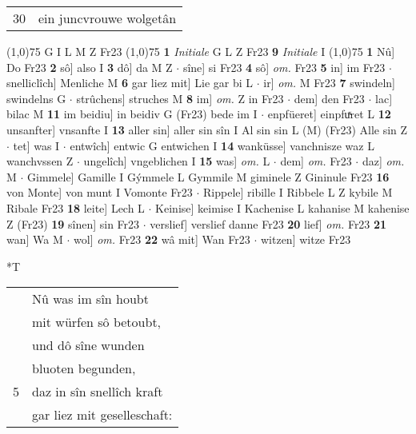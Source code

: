 \documentclass[8pt,a4paper,notitlepage]{article}
\begin{document}
\begin{table}[ht]
\begin{minipage}[t]{0.5\linewidth}
\begin{tabular}{rl}
30 & ein juncvrouwe wolgetân\\ 
\end{tabular}
\scriptsize
\line(1,0){75} \newline
G I L M Z Fr23 \newline
\line(1,0){75} \newline
\textbf{1} \textit{Initiale} G L Z Fr23  \textbf{9} \textit{Initiale} I  \newline
\line(1,0){75} \newline
\textbf{1} Nû] Do Fr23 \textbf{2} sô] also I \textbf{3} dô] da M Z  $\cdot$ sîne] si Fr23 \textbf{4} sô] \textit{om.} Fr23 \textbf{5} in] im Fr23  $\cdot$ snelliclîch] Menliche M \textbf{6} gar liez mit] Lie gar bi L  $\cdot$ ir] \textit{om.} M Fr23 \textbf{7} swindeln] swindelns G  $\cdot$ strûchens] struches M \textbf{8} im] \textit{om.} Z in Fr23  $\cdot$ dem] den Fr23  $\cdot$ lac] bilac M \textbf{11} im beidiu] in beidiv G (Fr23) bede im I  $\cdot$ enpfüeret] einpfuͯret L \textbf{12} unsanfter] vnsanfte I \textbf{13} aller sin] aller sin sîn I Al sin sin L (M) (Fr23) Alle sin Z  $\cdot$ tet] was I  $\cdot$ entwîch] entwic G entwichen I \textbf{14} wanküsse] vanchnisze waz L wanchvssen Z  $\cdot$ ungelîch] vngeblichen I \textbf{15} was] \textit{om.} L  $\cdot$ dem] \textit{om.} Fr23  $\cdot$ daz] \textit{om.} M  $\cdot$ Gimmele] Gamille I Gýmmele L Gymmile M giminele Z Gininule Fr23 \textbf{16} von Monte] von munt I Vomonte Fr23  $\cdot$ Rippele] ribille I Ribbele L Z kybile M Ribale Fr23 \textbf{18} leite] Lech L  $\cdot$ Keinise] keimise I Kachenise L kahanise M kahenise Z (Fr23) \textbf{19} sînen] sin Fr23  $\cdot$ verslief] verslief danne Fr23 \textbf{20} lief] \textit{om.} Fr23 \textbf{21} wan] Wa M  $\cdot$ wol] \textit{om.} Fr23 \textbf{22} wâ mit] Wan Fr23  $\cdot$ witzen] witze Fr23 \newline
\end{minipage}
\hspace{0.5cm}
\begin{minipage}[t]{0.5\linewidth}
\small
\begin{center}*T
\end{center}
\begin{tabular}{rl}
 & Nû was im sîn houbt\\ 
 & mit würfen sô betoubt,\\ 
 & und dô sîne wunden\\ 
 & bluoten begunden,\\ 
5 & daz in sîn snellîch kraft\\ 
 & gar liez mit geselleschaft:\\ 

\end{tabular}
\end{minipage}
\end{table}
\end{document}
